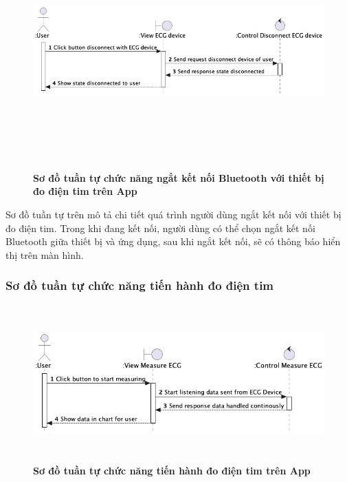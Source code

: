   \begin{figure}[H]
        \centering
        \includegraphics[width=16cm,height=9cm]{Images/mobile_app/disconnect_with_device.png}
        \caption[Sơ đồ tuần tự chức năng ngắt kết nối Bluetooth với thiết bị đo điện tim trên App]{\bfseries \fontsize{12pt}{0pt}
        \selectfont Sơ đồ tuần tự chức năng ngắt kết nối Bluetooth với thiết bị đo điện tim trên App}
        \label{disconnect_with_device} %
  \end{figure}

  Sơ đồ tuần tự trên mô tả chi tiết quá trình người dùng ngắt kết nối với thiết bị đo điện tim. Trong khi đang kết nối, người dùng
  có thể chọn ngắt kết nối Bluetooth giữa thiết bị và ứng dụng, sau khi ngắt kết nối, sẽ có thông báo
  hiển thị trên màn hình.

\subsubsection{Sơ đồ tuần tự chức năng tiến hành đo điện tim}

  \begin{figure}[H]
        \centering
        \includegraphics[width=12cm,height=6cm]{Images/mobile_app/start_measuring_ecg.png}
        \caption[Sơ đồ tuần tự chức năng tiến hành đo điện tim trên App]{\bfseries \fontsize{12pt}{0pt}
        \selectfont Sơ đồ tuần tự chức năng tiến hành đo điện tim trên App}
        \label{start_measuring_ecg} %
  \end{figure}
 
